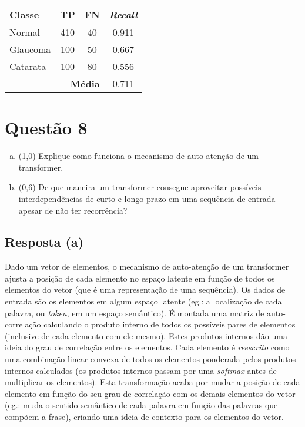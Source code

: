 \documentclass[final,3p]{elsarticle}
\numberwithin{equation}{section}
\begin{document}
        \begin{table}[H]
            \centering
            \begin{tabular}{l c c c}
                \toprule
                \textbf{Classe} & \textbf{TP} & \textbf{FN} & \textbf{\emph{Recall}} \\
                \midrule
                Normal   & 410 & 40 & 0.911 \\
                Glaucoma & 100 & 50 & 0.667 \\
                Catarata & 100 & 80 & 0.556 \\
                \midrule
                         & \multicolumn{2}{r}{\textbf{Média}} & 0.711 \\
                \bottomrule
            \end{tabular}
        \end{table}

\section{Questão 8}

    \begin{enumerate}[(a)]
        \item (1,0) Explique como funciona o mecanismo de auto-atenção de um transformer.
        \item (0,6) De que maneira um transformer consegue aproveitar possíveis interdependências de curto e longo prazo em uma sequência de entrada apesar de não ter recorrência?
    \end{enumerate}

    \subsection{Resposta \textbf{(a)}}
        Dado um vetor de elementos, o mecanismo de auto-atenção de um transformer ajusta a posição de cada elemento no espaço latente em função de todos os elementos do vetor (que é uma representação de uma sequência). Os dados de entrada são os elementos em algum espaço latente (eg.: a localização de cada palavra, ou \emph{token}, em um espaço semântico). É montada uma matriz de auto-correlação calculando o produto interno de todos os possíveis pares de elementos (inclusive de cada elemento com ele mesmo). Estes produtos internos dão uma ideia do grau de correlação entre os elementos. Cada elemento é \emph{reescrito} como uma combinação linear convexa de todos os elementos ponderada pelos produtos internos calculados (os produtos internos passam por uma \emph{softmax} antes de multiplicar os elementos). Esta transformação acaba por mudar a posição de cada elemento em função do seu grau de correlação com os demais elementos do vetor (eg.: muda o sentido semântico de cada palavra em função das palavras que compõem a frase), criando uma ideia de contexto para os elementos do vetor.
\end{document}
